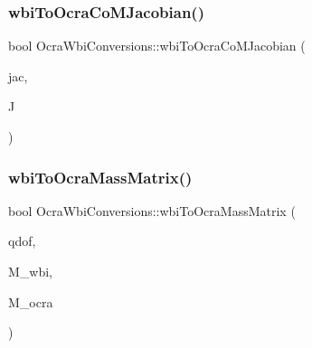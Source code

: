 \hypertarget{classocra__icub_1_1OcraWbiConversions_a86458de950caa3bde3aa1d1aff448be1}{}\label{classocra__icub_1_1OcraWbiConversions_a86458de950caa3bde3aa1d1aff448be1} 
\subsubsection{\texorpdfstring{wbi\+To\+Ocra\+Co\+M\+Jacobian()}{wbiToOcraCoMJacobian()}}
{\footnotesize\ttfamily bool Ocra\+Wbi\+Conversions\+::wbi\+To\+Ocra\+Co\+M\+Jacobian (\begin{DoxyParamCaption}\item[{const Eigen\+::\+Matrix\+Xd \&}]{jac,  }\item[{Eigen\+::\+Matrix$<$ double, 3, Eigen\+::\+Dynamic $>$ \&}]{J }\end{DoxyParamCaption})\hspace{0.3cm}{\ttfamily [static]}}

\hypertarget{classocra__icub_1_1OcraWbiConversions_abaa2b7a9069b60cfb36cb21e89b98177}{}\label{classocra__icub_1_1OcraWbiConversions_abaa2b7a9069b60cfb36cb21e89b98177} 
\subsubsection{\texorpdfstring{wbi\+To\+Ocra\+Mass\+Matrix()}{wbiToOcraMassMatrix()}}
{\footnotesize\ttfamily bool Ocra\+Wbi\+Conversions\+::wbi\+To\+Ocra\+Mass\+Matrix (\begin{DoxyParamCaption}\item[{int}]{qdof,  }\item[{const Eigen\+::\+Matrix\+Xd \&}]{M\+\_\+wbi,  }\item[{Eigen\+::\+Matrix\+Xd \&}]{M\+\_\+ocra }\end{DoxyParamCaption})\hspace{0.3cm}{\ttfamily [static]}}

\hypertarget{classocra__icub_1_1OcraWbiConversions_a25a64172ebb14db9ddf301880a433964}{}\label{classocra__icub_1_1OcraWbiConversions_a25a64172ebb14db9ddf301880a433964} 

